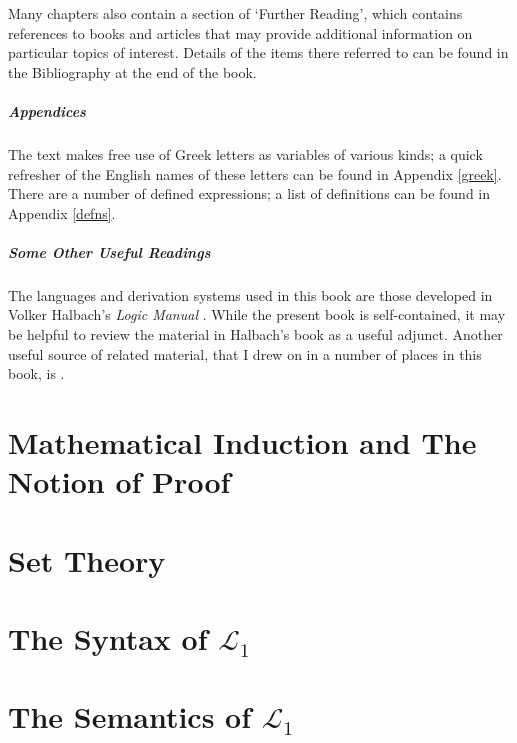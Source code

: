 \documentclass[openany,leqno,11pt,draft]{book}
\theoremstyle{break}
\theoremstyle{definition}
\theoremstyle{remark}
\begin{document}
Many chapters also contain a section of `Further Reading', which contains references to books and articles that may provide additional information on particular topics of interest. Details of the items there referred to can be found in the Bibliography at the end of the book.

\paragraph{Appendices} The text makes free use of Greek letters as variables of various kinds; a quick refresher of the English names of these letters can be found in Appendix \ref{greek}. There are a number of defined expressions; a list of definitions can be found in Appendix \ref{defns}.

\paragraph{Some Other Useful Readings} The languages and derivation systems used in this book are those developed in Volker Halbach's \emph{Logic Manual} \citep{hallogma}. While the present book is self-contained, it may be helpful to review the material in Halbach's book as a useful adjunct. Another useful source of related material, that I drew on in a number of places in this book, is \citet{bosintlo}.  

\newpage

\chapter[Mathematical Induction and Proof]{Mathematical Induction and The Notion of Proof}\label{c1}
 

	\newpage
	\chapter{Set Theory}\label{c2}
	 
		\newpage
		
\chapter{The Syntax of $\mathcal{L}_{1}$}\label{c3}
	
\newpage

\chapter{The Semantics of $\mathcal{L}_{1}$}\label{c3a}
  
\newpage
\end{document}
